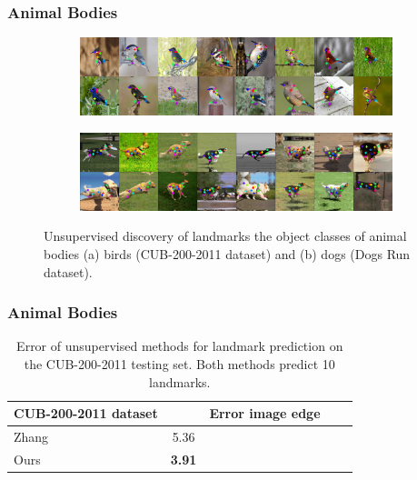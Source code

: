 		\begin{frame}[t]
		\frametitle{Animal Bodies}
			\begin{figure}[htp]
				\centering
				\begin{subfigure}{1.\textwidth}
				\includegraphics[trim={0cm 0cm 0cm 0cm},clip, width=1.\linewidth]{fig/shape/0birds}\caption{}
				\end{subfigure}
				\begin{subfigure}{1.\textwidth}
				\includegraphics[trim={0cm 0cm 0cm 0cm},clip, width=1.\linewidth]{fig/shape/0dogs}\caption{}
				\end{subfigure}
				\caption{{Unsupervised discovery of landmarks the object classes of animal bodies (a) birds (CUB-200-2011 dataset) and (b) dogs (Dogs Run dataset).}}
				\label{fig:kp_animals}
			\end{figure}
		\end{frame}

		\begin{frame}[t]
		\frametitle{Animal Bodies}
			\begin{table}[t]
				\caption{Error of unsupervised methods for landmark prediction on the CUB-200-2011 testing set. Both methods predict 10 landmarks.}
				\label{tab:birds}
				\centering
				\begin{tabular}{l|cccc}
					\hline
					CUB-200-2011 dataset&  & Error \wrt image edge\\
					\hline
					Zhang \cite{zhang18} & 5.36 \\
					Ours  & \textbf{3.91}  \\ \hline
				\end{tabular}
			\end{table}
		\end{frame}

